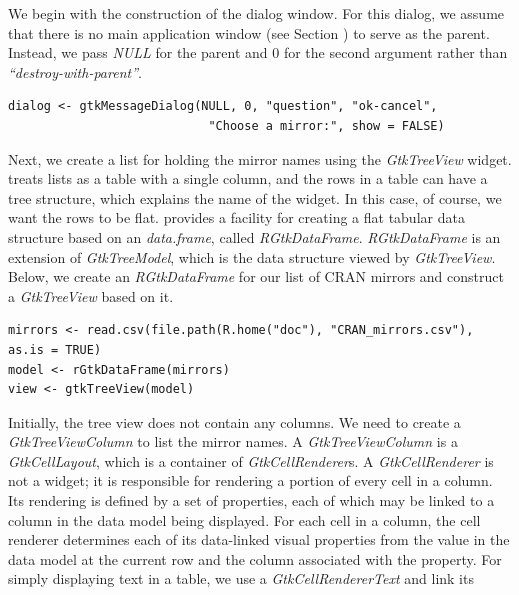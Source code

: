 \documentclass[article]{jss}
\begin{document}
We begin with the construction of the dialog window. For this dialog,
we 
assume that there is no main application window (see Section
\label{sec:spreadsheet-example}) to serve as the
parent. 
Instead, we pass \emph{NULL} for the parent and $0$ for the second
argument 
rather than \emph{``destroy-with-parent''}.
\begin{verbatim}
dialog <- gtkMessageDialog(NULL, 0, "question", "ok-cancel", 
                            "Choose a mirror:", show = FALSE)
\end{verbatim}
Next, we create a list for holding the mirror names using the
\emph{GtkTreeView}
widget.  treats lists as a table with a single column, and
the rows in
a table can have a tree structure, which explains the name of the
widget.
In this case, of course, we want the rows to be flat. 
provides a 
facility for creating a flat tabular data structure based on an
\emph{data.frame}, called \emph{RGtkDataFrame}. \emph{RGtkDataFrame}
is
an extension of \emph{GtkTreeModel}, which is the data structure
viewed by
\emph{GtkTreeView}. Below, we create an \emph{RGtkDataFrame} for our
list
of CRAN mirrors and construct a \emph{GtkTreeView} based on it.
\begin{verbatim}
mirrors <- read.csv(file.path(R.home("doc"), "CRAN_mirrors.csv"),
as.is = TRUE)
model <- rGtkDataFrame(mirrors)
view <- gtkTreeView(model)
\end{verbatim}
Initially, the tree view does not contain any columns. We need to
create a \emph{GtkTreeViewColumn} to list the mirror names. A
\emph{GtkTreeViewColumn}
is a \emph{GtkCellLayout}, which is a container of
\emph{GtkCellRenderer}s. 
A \emph{GtkCellRenderer} is not a widget; it is responsible for
rendering
a portion of every cell in a column. Its rendering is defined by a set
of
properties, each of which may be linked to a column in the data model
being displayed. For each
cell in a column, the cell renderer determines each of its data-linked
visual
properties from the value in the data model at the current
row and the column associated with the property. For simply displaying
text in a table, we use a \emph{GtkCellRendererText} and link its
\end{document}
